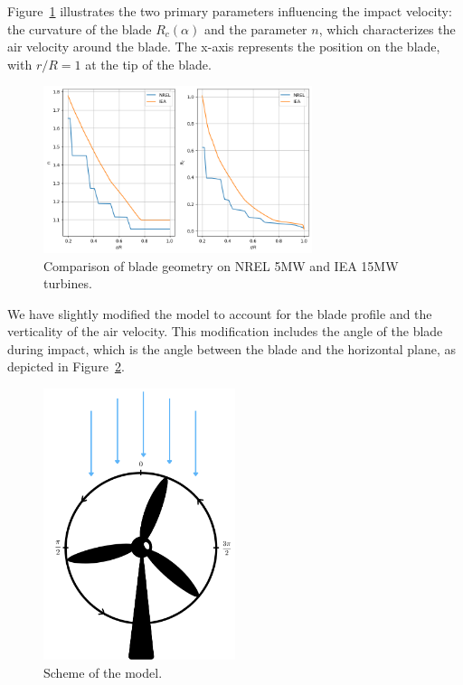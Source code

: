 \documentclass[10pt]{report}
\begin{document}
Figure~\ref{fig:comparison_turbines} illustrates the two primary parameters influencing the impact velocity: the curvature of the blade \(R_c(\alpha)\) and the parameter \(n\), which characterizes the air velocity around the blade. The x-axis represents the position on the blade, with \(r/R = 1\) at the tip of the blade.

\begin{figure}[H]
    \centering
    \includegraphics[width=0.7\textwidth]{figures/n_rc_comp.png}
    \caption{Comparison of blade geometry on NREL 5MW and IEA 15MW turbines.}
    \label{fig:comparison_turbines}
\end{figure}

We have slightly modified the model to account for the blade profile and the verticality of the air velocity. This modification includes the angle of the blade during impact, which is the angle between the blade and the horizontal plane, as depicted in Figure~\ref{fig:scheme_theta}.

\begin{figure}[H]
    \centering
    \includegraphics[width=0.5\textwidth]{figures/scheme_theta.png}
    \caption{Scheme of the model.}
    \label{fig:scheme_theta}
\end{figure}
\end{document}
